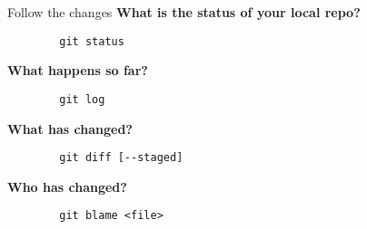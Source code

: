 


\begin{frame}[fragile]{Follow the changes}
    \textbf{What is the status of your local repo?}
    \begin{lstlisting}
        git status
    \end{lstlisting}
    \textbf{What happens so far?}
    \begin{lstlisting}
        git log
    \end{lstlisting}
    \textbf{What has changed?}
    \begin{lstlisting}
        git diff [--staged]
    \end{lstlisting}
    \textbf{Who has changed?}
    \begin{lstlisting}
        git blame <file>
    \end{lstlisting}
\end{frame}

